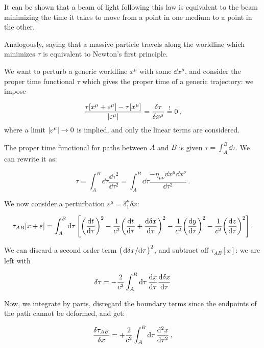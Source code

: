 \documentclass[main.tex]{subfiles}
\begin{document}
It can be shown that a beam of light following this law is equivalent to the beam minimizing the time it takes to move from a point in one medium to a point in the other.

Analogously, saying that a massive particle travels along the worldline which minimizes \(\tau\) is equivalent to Newton's first principle.

We want to perturb a generic  worldline \(x^{\mu}\) with some \(\dd{x^{\mu}}\), and consider the proper time functional \(\tau\) which gives the proper time of a generic trajectory: we impose

\begin{equation}
  \frac{\tau \qty[x^{\mu} + \varepsilon^\mu] - \tau \qty[x^{\mu}]}{\abs{\varepsilon ^\mu} } = \frac{\delta \tau}{\delta x^\mu} \overset{!}{=}  0\,,
\end{equation}
%
where a limit \(\abs{\varepsilon^{\mu}} \rightarrow 0 \) is implied, and only the linear terms are considered.

The proper time functional for paths between \(A\) and \(B\) is given \(\tau = \int _A^B \dd{\tau}\).  
We can rewrite it as:

\begin{equation}
  \tau = \int_A^B \dd{\tau} \frac{\dd{\tau^2}}{\dd{\tau^2}}
  = \int_A^B \dd{\tau} \frac{-\eta_{\mu \nu}\dd{x^{\mu} \dd{x^{\nu}}}}{\dd{\tau^2}}\,.
\end{equation}

We now consider a perturbation \(\varepsilon^{\mu} = \delta^{\mu}_1 \delta x\):

\begin{equation}
  \tau_{AB}[x + \varepsilon] = \int_A^B \dd{\tau}
  \qty[\qty(\dv{t}{\tau})^2 
  - \frac{1}{c^{2}} \qty(\dv{t}{\tau} + \dv{\delta x}{\tau})^2 
  - \frac{1}{c^{2}} \qty(\dv{y}{\tau})^2
  - \frac{1}{c^{2}} \qty(\dv{z}{\tau})^2]\,.
\end{equation}

We can discard a second order term \(\qty(\dv*{\delta x}{\tau})^2\), and subtract off \(\tau_{AB}[x]\): we are left with 

\begin{equation}
  \delta \tau = - \frac{2}{c^{2}} \int_A^B \dd{\tau} \dv{x}{\tau} \dv{\delta x}{\tau} 
\end{equation}

Now, we integrate by parts, disregard the boundary terms since the endpoints of the path cannot be deformed, and get:

\begin{equation}
  \frac{\delta \tau_{AB}}{\delta x} = + \frac{2}{c^{2}} \int_A^B \dd{\tau} \dv[2]{x}{\tau} \,,
\end{equation}
\end{document}
